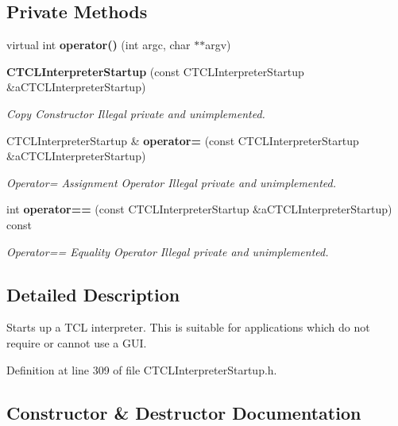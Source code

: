 \subsection*{Private Methods}
\begin{CompactItemize}
\item 
virtual int {\bf operator()} (int argc, char $\ast$$\ast$argv)
\item 
{\bf CTCLInterpreter\-Startup} (const CTCLInterpreter\-Startup \&a\-CTCLInterpreter\-Startup)
\begin{CompactList}\small\item\em Copy Constructor Illegal private and unimplemented.\item\end{CompactList}\item 
CTCLInterpreter\-Startup \& {\bf operator=} (const CTCLInterpreter\-Startup \&a\-CTCLInterpreter\-Startup)
\begin{CompactList}\small\item\em Operator= Assignment Operator Illegal private and unimplemented.\item\end{CompactList}\item 
int {\bf operator==} (const CTCLInterpreter\-Startup \&a\-CTCLInterpreter\-Startup) const
\begin{CompactList}\small\item\em Operator== Equality Operator Illegal private and unimplemented.\item\end{CompactList}\end{CompactItemize}


\subsection{Detailed Description}
Starts up a TCL interpreter. This is suitable for applications which do not require or cannot use a GUI. 



Definition at line 309 of file CTCLInterpreter\-Startup.h.

\subsection{Constructor \& Destructor Documentation}
